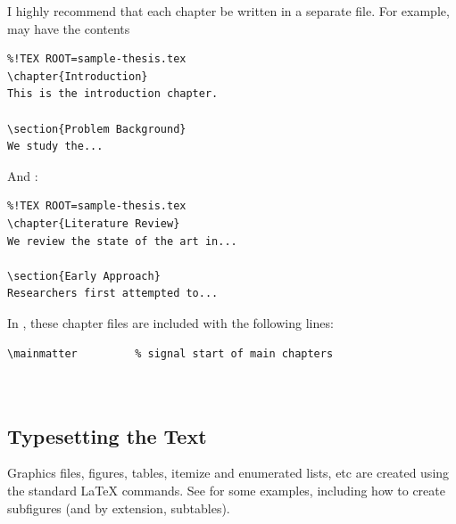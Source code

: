 \documentclass[a4paper,nofonts,raggedright,titlepage,openany]{tufte-book}
\begin{document}
I highly recommend that each chapter be written in a separate file. For example,  may have the contents

\begin{verbatim}
%!TEX ROOT=sample-thesis.tex
\chapter{Introduction}
This is the introduction chapter.

\section{Problem Background}
We study the...
\end{verbatim}



And :
\begin{verbatim}
%!TEX ROOT=sample-thesis.tex
\chapter{Literature Review}
We review the state of the art in...

\section{Early Approach}
Researchers first attempted to...
\end{verbatim}


In , these chapter files are included with the following lines:

\begin{verbatim}
\mainmatter         % signal start of main chapters



\end{verbatim}

\subsection{Typesetting the Text}

Graphics files, figures, tables, itemize and enumerated lists, etc are created using the standard \LaTeX{} commands. See  for some examples, including how to create subfigures (and by extension, subtables).
\end{document}
